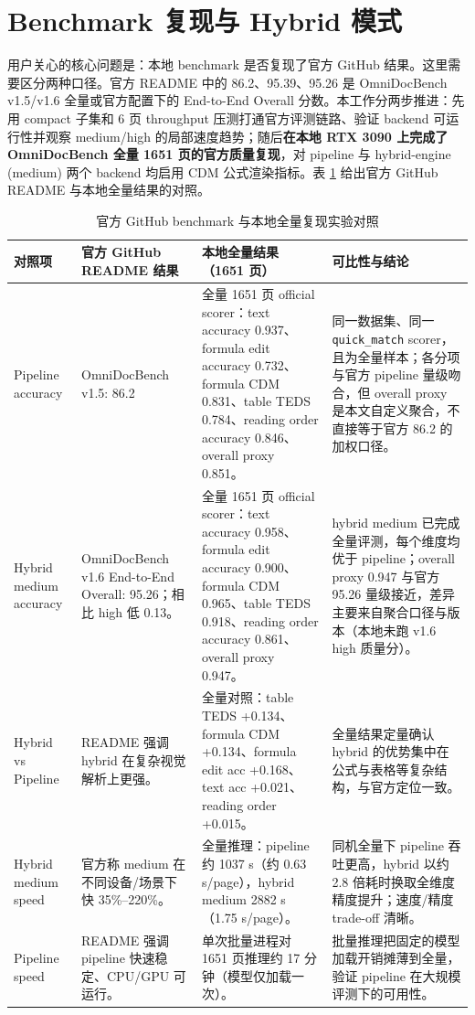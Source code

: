 \documentclass[UTF8,a4paper,11pt]{ctexart}
\begin{document}
\section{Benchmark 复现与 Hybrid 模式}

用户关心的核心问题是：本地 benchmark 是否复现了官方 GitHub 结果。这里需要区分两种口径。官方 README 中的 86.2、95.39、95.26 是 OmniDocBench v1.5/v1.6 全量或官方配置下的 End-to-End Overall 分数。本工作分两步推进：先用 compact 子集和 6 页 throughput 压测打通官方评测链路、验证 backend 可运行性并观察 medium/high 的局部速度趋势；随后\textbf{在本地 RTX 3090 上完成了 OmniDocBench 全量 1651 页的官方质量复现}，对 pipeline 与 hybrid-engine (medium) 两个 backend 均启用 CDM 公式渲染指标。表 \ref{tab:official-local-compare} 给出官方 GitHub README 与本地全量结果的对照。

\begin{table}[H]
\centering
\caption{官方 GitHub benchmark 与本地全量复现实验对照}
\label{tab:official-local-compare}
\scriptsize
\begin{tabularx}{\linewidth}{p{2.6cm}p{3.2cm}p{4.3cm}X}
\toprule
对照项 & 官方 GitHub README 结果 & 本地全量结果（1651 页） & 可比性与结论 \\
\midrule
Pipeline accuracy & OmniDocBench v1.5: 86.2 & 全量 1651 页 official scorer：text accuracy 0.937、formula edit accuracy 0.732、formula CDM 0.831、table TEDS 0.784、reading order accuracy 0.846、overall proxy 0.851。 & 同一数据集、同一 \texttt{quick\_match} scorer，且为全量样本；各分项与官方 pipeline 量级吻合，但 overall proxy 是本文自定义聚合，不直接等于官方 86.2 的加权口径。\\
Hybrid medium accuracy & OmniDocBench v1.6 End-to-End Overall: 95.26；相比 high 低 0.13。 & 全量 1651 页 official scorer：text accuracy 0.958、formula edit accuracy 0.900、formula CDM 0.965、table TEDS 0.918、reading order accuracy 0.861、overall proxy 0.947。 & hybrid medium 已完成全量评测，每个维度均优于 pipeline；overall proxy 0.947 与官方 95.26 量级接近，差异主要来自聚合口径与版本（本地未跑 v1.6 high 质量分）。\\
Hybrid vs Pipeline & README 强调 hybrid 在复杂视觉解析上更强。 & 全量对照：table TEDS +0.134、formula CDM +0.134、formula edit acc +0.168、text acc +0.021、reading order +0.015。 & 全量结果定量确认 hybrid 的优势集中在公式与表格等复杂结构，与官方定位一致。\\
Hybrid medium speed & 官方称 medium 在不同设备/场景下快 35\%--220\%。 & 全量推理：pipeline 约 1037 s（约 0.63 s/page），hybrid medium 2882 s（1.75 s/page）。 & 同机全量下 pipeline 吞吐更高，hybrid 以约 2.8 倍耗时换取全维度精度提升；速度/精度 trade-off 清晰。\\
Pipeline speed & README 强调 pipeline 快速稳定、CPU/GPU 可运行。 & 单次批量进程对 1651 页推理约 17 分钟（模型仅加载一次）。 & 批量推理把固定的模型加载开销摊薄到全量，验证 pipeline 在大规模评测下的可用性。\\
\bottomrule
\end{tabularx}
\end{table}
\end{document}
